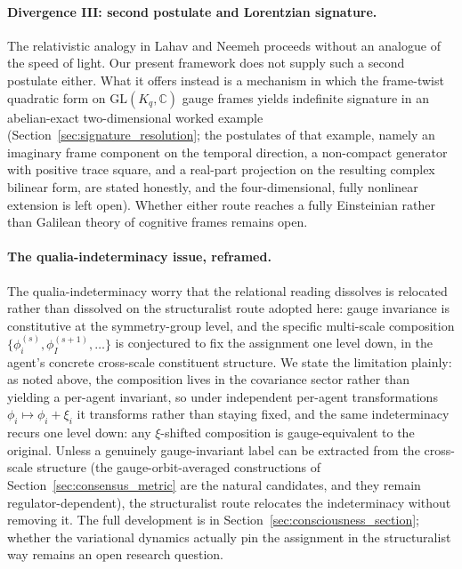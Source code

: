 \documentclass[11pt]{article}
\begin{document}
\paragraph{Divergence III: second postulate and Lorentzian signature.}
The relativistic analogy in Lahav and Neemeh proceeds without an analogue of the speed of light. Our present framework does not supply such a second postulate either. What it offers instead is a mechanism in which the frame-twist quadratic form on $\mathrm{GL}(K_q, \mathbb{C})$ gauge frames yields indefinite signature in an abelian-exact two-dimensional worked example (Section~\ref{sec:signature_resolution}; the postulates of that example, namely an imaginary frame component on the temporal direction, a non-compact generator with positive trace square, and a real-part projection on the resulting complex bilinear form, are stated honestly, and the four-dimensional, fully nonlinear extension is left open). Whether either route reaches a fully Einsteinian rather than Galilean theory of cognitive frames remains open.

\paragraph{The qualia-indeterminacy issue, reframed.}
The qualia-indeterminacy worry that the relational reading dissolves is relocated rather than dissolved on the structuralist route adopted here: gauge invariance is constitutive at the symmetry-group level, and the specific multi-scale composition $\{\phi_i^{(s)}, \phi_I^{(s+1)}, \ldots\}$ is conjectured to fix the assignment one level down, in the agent's concrete cross-scale constituent structure. We state the limitation plainly: as noted above, the composition lives in the covariance sector rather than yielding a per-agent invariant, so under independent per-agent transformations $\phi_i \mapsto \phi_i + \xi_i$ it transforms rather than staying fixed, and the same indeterminacy recurs one level down: any $\xi$-shifted composition is gauge-equivalent to the original. Unless a genuinely gauge-invariant label can be extracted from the cross-scale structure (the gauge-orbit-averaged constructions of Section~\ref{sec:consensus_metric} are the natural candidates, and they remain regulator-dependent), the structuralist route relocates the indeterminacy without removing it. The full development is in Section~\ref{sec:consciousness_section}; whether the variational dynamics actually pin the assignment in the structuralist way remains an open research question.
\end{document}
